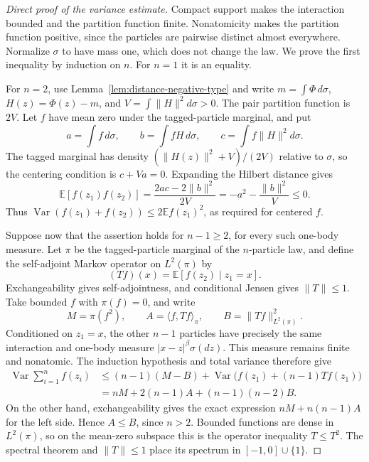 \documentclass[11pt]{article}
\theoremstyle{remark}\newtheorem{remark}[theorem]{Remark}
\begin{document}
\begin{proof}[Direct proof of the variance estimate]
Compact support makes the interaction bounded and the partition
function finite.  Nonatomicity makes the partition function positive,
since the particles are pairwise distinct almost everywhere.
Normalize $\sigma$ to have mass one, which does not change the law.
We prove the first inequality by induction on $n$.  For $n=1$ it is
an equality.

For $n=2$, use Lemma~\ref{lem:distance-negative-type} and write
$m=\int\Phi\,d\sigma$, $H(z)=\Phi(z)-m$, and
$V=\int\|H\|^2d\sigma>0$.  The pair partition function is $2V$.
Let $f$ have mean zero under the tagged-particle marginal, and put
\[
 a=\int f\,d\sigma,\qquad
 b=\int fH\,d\sigma,\qquad
 c=\int f\|H\|^2d\sigma.
\]
The tagged marginal has density $(\|H(z)\|^2+V)/(2V)$ relative to
$\sigma$, so the centering condition is $c+Va=0$.  Expanding the
Hilbert distance gives
\[
 \mathbb E[f(z_1)f(z_2)]
 =\frac{2ac-2\|b\|^2}{2V}
 =-a^2-\frac{\|b\|^2}{V}\le0.
\]
Thus $\operatorname{Var}(f(z_1)+f(z_2))\le2\mathbb E f(z_1)^2$,
as required for centered $f$.

Suppose now that the assertion holds for $n-1\ge2$, for every such
one-body measure.  Let $\pi$ be the tagged-particle marginal of the
$n$-particle law, and define the self-adjoint Markov operator on
$L^2(\pi)$ by
\[
 (Tf)(x)=\mathbb E[f(z_2)\mid z_1=x].
\]
Exchangeability gives self-adjointness, and conditional Jensen gives
$\|T\|\le1$.  Take bounded $f$ with $\pi(f)=0$, and write
\[
 M=\pi(f^2),\qquad A=\langle f,Tf\rangle_\pi,
 \qquad B=\|Tf\|_{L^2(\pi)}^2.
\]
Conditioned on $z_1=x$, the other $n-1$ particles have precisely the
same interaction and one-body measure $|x-z|^\beta\sigma(dz)$.
This measure remains finite and nonatomic.  The induction hypothesis
and total variance therefore give
\begin{align*}
 \operatorname{Var}\sum_{i=1}^nf(z_i)
 &\le (n-1)(M-B)
       +\operatorname{Var}\bigl(f(z_1)+(n-1)Tf(z_1)\bigr)\\
 &=nM+2(n-1)A+(n-1)(n-2)B.
\end{align*}
On the other hand, exchangeability gives the exact expression
$nM+n(n-1)A$ for the left side.  Hence $A\le B$, since $n>2$.
Bounded functions are dense in $L^2(\pi)$, so on the mean-zero
subspace this is the operator inequality $T\le T^2$.
The spectral theorem and $\|T\|\le1$ place its spectrum in
$[-1,0]\cup\{1\}$.


\end{proof}
\end{document}
